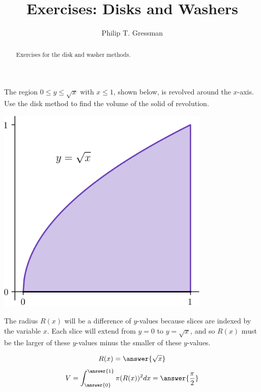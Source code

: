 \documentclass{ximera}
\title{Exercises: Disks and Washers}
\author{Philip T. Gressman}
\begin{document}
\begin{abstract}
Exercises for the disk and washer methods.
\end{abstract}
\maketitle

\begin{exercise}
The region $0 \leq y \leq \sqrt{x}$ with $x \leq 1$, shown below, is revolved around the $x$-axis. Use the disk method to find the volume of the solid of revolution.
\begin{center}
\begin{image}
\includegraphics[width=4in]{diskwasher/disk01.png}
\end{image}
\end{center}
\begin{hint}
The radius $R(x)$ will be a difference of $y$-values because slices are indexed by the variable $x$.
Each slice will extend from $y=0$ to $y =  \sqrt{x}$, and so $R(x)$ must be the larger of these $y$-values minus the smaller of these $y$-values.
\end{hint}
\begin{prompt}
\[ R(x) = \answer{\sqrt{x}} \]
\[ V = \int_{\answer{0}}^{\answer{1}} \pi (R(x))^2 dx =  \answer{\frac{\pi}{2}} \]
\end{prompt}
\end{exercise}
\end{document}
